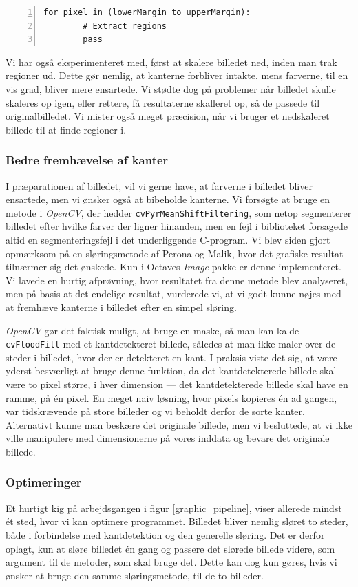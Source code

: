 {\begin{lstlisting}[caption={Pseudokode til udtrækning af regioner med
    margin.},captionpos=b,label={pseudo_fix},numbers=left,
    frame=tb, breaklines=false, float=h]
    for pixel in (lowerMargin to upperMargin):
        # Extract regions
        pass
\end{lstlisting}

Vi har også eksperimenteret med, først at skalere billedet ned, inden
man trak regioner ud. Dette gør nemlig, at kanterne forbliver intakte,
mens farverne, til en vis grad, bliver mere ensartede. Vi stødte dog på
problemer når billedet skulle skaleres op igen, eller rettere, få
resultaterne skalleret op, så de passede til originalbilledet. Vi mister
også meget præcision, når vi bruger et nedskaleret billede til at finde
regioner i.

\subsubsection{Bedre fremhævelse af kanter}
I præparationen af billedet, vil vi gerne have, at farverne i billedet
bliver ensartede, men vi ønsker også at bibeholde kanterne. Vi forsøgte
at bruge en metode i \emph{OpenCV}, der hedder
\texttt{cvPyrMeanShiftFiltering}, som netop segmenterer billedet efter
hvilke farver der ligner hinanden, men en fejl i biblioteket forsagede
altid en segmenteringsfejl i det underliggende C-program. Vi blev siden
gjort opmærksom på en sløringsmetode af Perona og
Malik\cite{perona1990scale}, hvor det grafiske resultat tilnærmer sig
det ønskede. Kun i Octaves \emph{Image}-pakke er denne implementeret. Vi
lavede en hurtig afprøvning, hvor resultatet fra denne metode blev
analyseret, men på basis at det endelige resultat, vurderede vi, at vi
godt kunne nøjes med at fremhæve kanterne i billedet efter en simpel
sløring.

\emph{OpenCV} gør det faktisk muligt, at bruge en maske, så man kan
kalde \texttt{cvFloodFill} med et kantdetekteret billede, således at man
ikke maler over de steder i billedet, hvor der er detekteret en kant. I
praksis viste det sig, at være yderst besværligt at bruge denne
funktion, da det kantdetekterede billede skal være to pixel større, i
hver dimension --- det kantdetekterede billede skal have en ramme, på én
pixel. En meget naiv løsning, hvor pixels kopieres én ad gangen, var
tidskrævende på store billeder og vi beholdt derfor de sorte kanter.
Alternativt kunne man beskære det originale billede, men vi besluttede,
at vi ikke ville manipulere med dimensionerne på vores inddata og bevare
det originale billede.

\subsubsection{Optimeringer}
Et hurtigt kig på arbejdsgangen i figur \ref{graphic_pipeline}, viser
allerede mindst ét sted, hvor vi kan optimere programmet. Billedet bliver
nemlig sløret to steder, både i forbindelse med kantdetektion og den
generelle sløring. Det er derfor oplagt, kun at sløre billedet én gang
og passere det slørede billede videre, som argument til de metoder, som
skal bruge det. Dette kan dog kun gøres, hvis vi ønsker at bruge den
samme sløringsmetode, til de to billeder.

}
